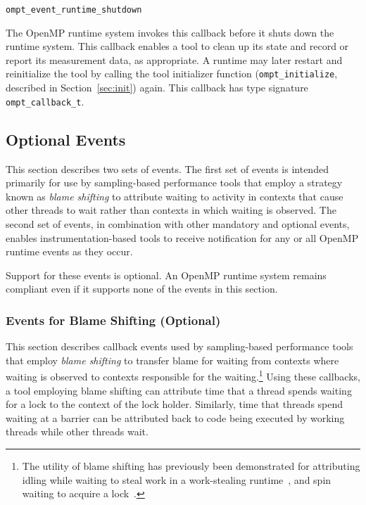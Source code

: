 \documentclass{article}
\newcommand{\descheader}[1]{{\needspace{3\baselineskip}\vspace{1em}\noindent \fbox{#1}}}
\begin{document}
\descheader{Termination}

\begin{description}

\item \verb|ompt_event_runtime_shutdown|
 
The OpenMP runtime system invokes this callback before it shuts down the
 runtime system.  This callback enables a tool to clean up its
 state and record or report its measurement data, as appropriate. A runtime may later restart and reinitialize the tool by
calling the tool initializer
function (\verb|ompt_initialize|, described in Section~\ref{sec:init}) again.
 This callback has type signature \verb|ompt_callback_t|. 


\end{description}

\subsection{Optional Events}
This section describes two sets of events. 
The first set of events is intended primarily for use by sampling-based performance tools that 
employ a strategy known as {\em blame shifting} to attribute waiting to activity in
 contexts that cause other threads to wait
rather than contexts in which waiting is observed.
The second set of events, in combination with other mandatory and optional events, 
enables instrumentation-based tools to receive notification for any or all OpenMP runtime events as they occur.
 
Support for these events is optional. An OpenMP runtime system remains compliant even if it supports none of the events in this section.


\subsubsection{Events for Blame Shifting (Optional)}
\label{sec:blame}
This section describes callback events used by sampling-based performance tools 
that employ {\em blame shifting} to transfer blame for waiting from contexts 
where waiting is observed to contexts responsible for the waiting.\footnote{The utility of blame shifting has previously been demonstrated for attributing 
idling while waiting to steal work 
in a work-stealing runtime~\cite{Tallent:PPoPP09}, and spin waiting to acquire a lock~\cite{Tallent:PPoPP10}.}
Using these callbacks, a tool employing blame shifting 
can attribute time that a thread spends waiting for a lock to the context of the lock holder.
Similarly, time that threads spend waiting at a barrier can be attributed back 
to code being executed by working threads while other threads wait.
\end{document}
